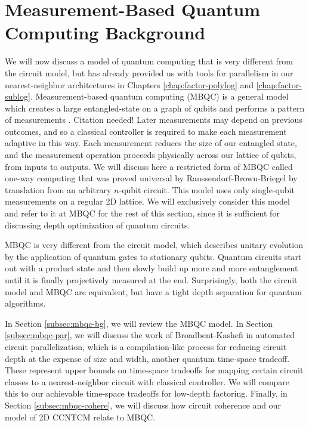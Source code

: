 \section{Measurement-Based Quantum Computing Background}
\label{sec:cohere-mbqc}

We will now discuss a model of quantum computing that is very different
from the circuit model, but has already provided us with tools for
parallelism in our nearest-neighbor architectures 
in Chapters \ref{chap:factor-polylog} and \ref{chap:factor-sublog}.
Measurement-based quantum computing (MBQC) is a general model which creates
a large entangled-state on a graph of qubits and performs a pattern of
measurements \cite{Briegel?}. Citation needed!
Later measurements may depend on previous outcomes, and so
a classical controller is required to make each measurement adaptive in this
way. Each measurement reduces the size of our entangled state, and the
measurement operation proceeds
physically across our lattice of qubits, from inputs to outputs.
We will discuss here a restricted form of MBQC called one-way computing
that was proved universal by Raussendorf-Brown-Briegel \cite{Raussendorf2003}
by translation from an arbitrary $n$-qubit circuit.
This model uses only single-qubit measurements on a
regular 2D lattice. We will exclusively consider this model and refer to it
at MBQC for the rest of this section, since it is sufficient for discussing
depth optimization of quantum circuits.

MBQC is very different from the circuit model, which describes unitary
evolution by the application of quantum gates to stationary qubits.
Quantum circuits start out with a product state and then slowly build up
more and more entanglement until it is finally projectively measured at the
end. Surprisingly, both the circuit model and MBQC are equivalent, but
have a tight depth separation for quantum algorithms.

In Section \ref{subsec:mbqc-bg}, we will review the MBQC model.
In Section \ref{subsec:mbqc-par}, we will discuss the work of
Broadbent-Kashefi in automated circuit parallelization, which is a
compilation-like process for reducing circuit depth at the expense of
size and width, another quantum time-space tradeoff. These represent
upper bounds on time-space tradeoffs for mapping certain circuit classes
to a nearest-neighbor circuit with classical controller. We will compare this
to our achievable time-space tradeoffs for low-depth factoring.
Finally, in Section \ref{subsec:mbqc-cohere}, we will discuss how
circuit coherence and our model of \textsf{2D CCNTCM} relate to MBQC.

